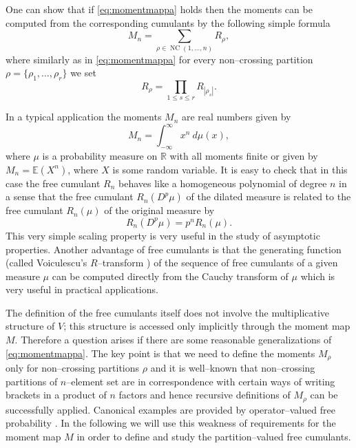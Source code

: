 \documentclass[12pt,dvips]{amsart}
\numberwithin{equation}{section} \numberwithin{figure}{section}
\theoremstyle{plain}
\theoremstyle{definition}
\theoremstyle{remark}
\newcommand{\E}{{\mathbb{E}}}
\newcommand{\R}{{\mathbb{R}}}
\newcommand{\MJM}{M^{\JM}}
\newcommand{\Mpp}{M^{\pp}}
\newcommand{\RJM}{R^{\JM}}
\newcommand{\Rpp}{R^{\pp}}
\DeclareMathOperator{\JM}{JM}
\DeclareMathOperator{\pp}{P}
\DeclareMathOperator{\NC}{NC}
\begin{document}
One can show \cite{Speicher1994} that if \eqref{eq:momentmappa}
holds then the moments can be computed from the corresponding
cumulants by the following simple formula
\begin{equation}
\label{eq:momentkumulant} M_n =\sum_{\rho\in\NC(1,\dots,n)}
R_{\rho},
\end{equation}
where similarly as in \eqref{eq:momentmappa} for every non--crossing
partition $\rho=\{\rho_1,\dots,\rho_r\}$ we set
$$
R_{\rho}=\prod_{1\leq s\leq r} R_{|\rho_s|}.
$$


In a typical application the moments $M_n$ are real numbers given by
$$ M_n= \int_{-\infty}^{\infty} x^n \ d\mu(x),$$
where $\mu$ is a probability measure on $\R$ with all moments finite
or given by $M_n=\E(X^n)$, where $X$ is some random variable. It is
easy to check that in this case the free cumulant $R_n$ behaves like
a homogeneous polynomial of degree $n$ in a sense that the free
cumulant $R_n(D^p \mu)$ of the dilated measure is related to the
free cumulant $R_n(\mu)$ of the original measure by
$$ R_n(D^p \mu)= p^n R_n(\mu).$$
This very simple scaling property is very useful in the study of
asymptotic properties. Another advantage of free cumulants is that
the generating function (called Voiculescu's $R$--transform
\cite{VoiculescuDykemaNica}) of the sequence of free cumulants of a
given measure $\mu$ can be computed directly from the Cauchy
transform of $\mu$ which is very useful in practical applications.


The definition of the free cumulants itself does not involve the
multiplicative structure of $V$; this structure is accessed only
implicitly through the moment map $M$. Therefore a question arises
if there are some reasonable generalizations of
\eqref{eq:momentmappa}. The key point is that we need to define the
moments $M_\rho$ only for non--crossing partitions $\rho$ and it is
well--known that non--crossing partitions of $n$--element set are in
correspondence with certain ways of writing brackets in a product of
$n$ factors and hence recursive definitions of $M_\rho$ can be
successfully applied. Canonical examples are provided by
operator--valued free probability \cite{Speicher1998}. In the
following we will use this weakness of requirements for the moment
map $M$ in order to define and study the partition--valued free
cumulants.
\end{document}

